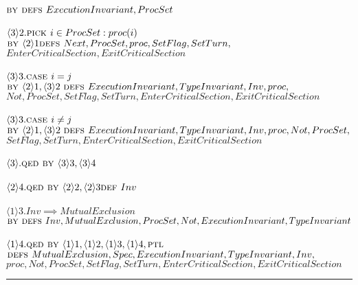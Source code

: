 \documentclass[fleqn]{tukseminar}
\begin{document}
			\hspace*{3.2cm}$\textsc{by } \textsc{defs } ExecutionInvariant,ProcSet$\\\\
			\hspace*{2.8cm}$\langle3\rangle2. \textsc{pick } i \in ProcSet : proc(i) $\\
			\hspace*{3.2cm}$\textsc{by } \langle2\rangle1 \textsc{defs } Next,ProcSet,proc, SetFlag, SetTurn,$\\
			\hspace*{3.2cm}$EnterCriticalSection, ExitCriticalSection$\\\\
			\hspace*{2.8cm}$\langle3\rangle3. \textsc{case } i =j $\\
			\hspace*{3.2cm}$\textsc{by } \langle2\rangle1 , \langle3\rangle2\  \textsc{defs } ExecutionInvariant, TypeInvariant, Inv, proc,$\\
			\hspace*{3.2cm}$Not,ProcSet, SetFlag, SetTurn, EnterCriticalSection, ExitCriticalSection$\\\\
			\hspace*{2.8cm}$\langle3\rangle3. \textsc{case } i \neq j $\\
			\hspace*{3.2cm}$\textsc{by } \langle2\rangle1 , \langle3\rangle2\  \textsc{defs } ExecutionInvariant, TypeInvariant, Inv, proc, Not,ProcSet,$\\
			\hspace*{3.2cm}$SetFlag, SetTurn, EnterCriticalSection, ExitCriticalSection$\\\\
			\hspace*{2.8cm}$\langle3\rangle. \textsc{qed } \textsc{by } \langle3\rangle3 , \langle3\rangle4 $\\\\
			\hspace*{1.6cm}$\langle2\rangle4. \textsc{qed } \textsc{by } \langle2\rangle2 , \langle2\rangle3 \textsc{def } Inv $\\\\
			\hspace*{0.8cm}$\langle1\rangle3. Inv \implies MutualExclusion$\\
			\hspace*{1.2cm}$ \textsc{by }\textsc{defs } Inv, MutualExclusion,ProcSet,Not,ExecutionInvariant,TypeInvariant$\\\\
			\hspace*{0.8cm}$\langle1\rangle4. \textsc{qed } \textsc{by } \langle1\rangle1,\langle1\rangle2,\langle1\rangle3,\langle1\rangle4, \textsc{ptl }$\\
			\hspace*{1.2cm}$\textsc{defs } MutualExclusion,Spec,ExecutionInvariant, TypeInvariant, Inv, $\\
			\hspace*{1.2cm} $proc, Not,ProcSet, SetFlag, SetTurn, EnterCriticalSection, ExitCriticalSection$\\
			
			\hrule
			
			
			\newpage
			\nocite{*}
			
			
			
		
\end{document}
